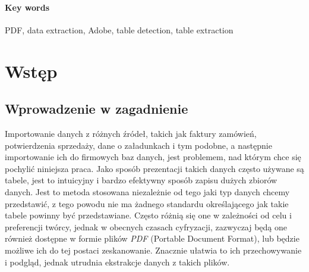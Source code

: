 \documentclass[a4paper,twoside,12pt]{book}
\newcounter{stronyPozaNumeracja}
\begin{document}
\subsubsection*{Key words}  
\begin{otherlanguage}{british}
 PDF, data extraction, Adobe, table detection, table extraction
\end{otherlanguage}




\tableofcontents

\setcounter{stronyPozaNumeracja}{\value{page}}
\mainmatter
\pagestyle{empty}

\cleardoublepage

\pagestyle{NumeryStronNazwyRozdzialow}


\chapter{Wstęp}


\section{Wprowadzenie w zagadnienie}

Importowanie danych z różnych źródeł, takich jak faktury zamówień, potwierdzenia sprzedaży, dane o załadunkach i tym podobne, a następnie importowanie ich do firmowych baz danych, jest problemem, nad którym chce się pochylić niniejsza praca. Jako sposób prezentacji takich danych często używane są tabele, jest to intuicyjny i bardzo efektywny sposób zapisu dużych zbiorów danych. Jest to metoda stosowana niezależnie od tego jaki typ danych chcemy przedstawić, z tego powodu nie ma żadnego standardu określającego jak takie tabele powinny być przedstawiane. Często różnią się one w zależności od celu i preferencji twórcy, jednak w obecnych czasach cyfryzacji, zazwyczaj  będą one również dostępne w formie plików \emph{PDF} (Portable Document Format), lub będzie możliwe ich do tej postaci zeskanowanie. Znacznie ułatwia to ich przechowywanie i podgląd, jednak utrudnia ekstrakcje danych z takich plików. 
\end{document}
